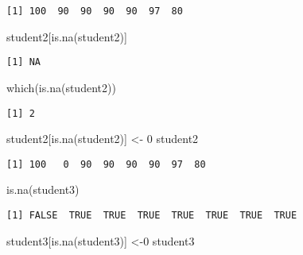 \documentclass[
  letterpaper,
  DIV=11,
  numbers=noendperiod]{scrartcl}
\newenvironment{Shaded}{\begin{snugshade}}{\end{snugshade}}
\newcommand{\DecValTok}[1]{\textcolor[rgb]{0.68,0.00,0.00}{#1}}
\newcommand{\FunctionTok}[1]{\textcolor[rgb]{0.28,0.35,0.67}{#1}}
\newcommand{\NormalTok}[1]{\textcolor[rgb]{0.00,0.23,0.31}{#1}}
\newcommand{\OtherTok}[1]{\textcolor[rgb]{0.00,0.23,0.31}{#1}}
\begin{document}
\begin{verbatim}
[1] 100  90  90  90  90  97  80
\end{verbatim}

\begin{Shaded}
\begin{Highlighting}[]
\NormalTok{student2[}\FunctionTok{is.na}\NormalTok{(student2)]}
\end{Highlighting}
\end{Shaded}

\begin{verbatim}
[1] NA
\end{verbatim}

\begin{Shaded}
\begin{Highlighting}[]
\FunctionTok{which}\NormalTok{(}\FunctionTok{is.na}\NormalTok{(student2))}
\end{Highlighting}
\end{Shaded}

\begin{verbatim}
[1] 2
\end{verbatim}

\begin{Shaded}
\begin{Highlighting}[]
\NormalTok{student2[}\FunctionTok{is.na}\NormalTok{(student2)] }\OtherTok{\textless{}{-}} \DecValTok{0}
\NormalTok{student2}
\end{Highlighting}
\end{Shaded}

\begin{verbatim}
[1] 100   0  90  90  90  90  97  80
\end{verbatim}

\begin{Shaded}
\begin{Highlighting}[]
\FunctionTok{is.na}\NormalTok{(student3)}
\end{Highlighting}
\end{Shaded}

\begin{verbatim}
[1] FALSE  TRUE  TRUE  TRUE  TRUE  TRUE  TRUE  TRUE
\end{verbatim}

\begin{Shaded}
\begin{Highlighting}[]
\NormalTok{student3[}\FunctionTok{is.na}\NormalTok{(student3)] }\OtherTok{\textless{}{-}}\DecValTok{0}
\NormalTok{student3}
\end{Highlighting}
\end{Shaded}
\end{document}
